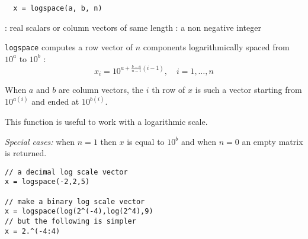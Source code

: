 \begin{mandesc}
\end{mandesc}
\begin{calling_sequence}
\begin{verbatim}
  x = logspace(a, b, n)
\end{verbatim}
\end{calling_sequence}

\begin{parameters}
  \begin{varlist}
    : real scalars or column vectors of same length
    : a non negative integer
  \end{varlist}
\end{parameters}
\begin{mandescription}
  \verb+logspace+ computes a row vector of $n$ components logarithmically spaced from $10^a$ to $10^b$ :
$$
    x_i = 10^{a + \frac{b-a}{n-1} (i-1)}, \quad i = 1, \dots, n
$$

   When $a$ and $b$ are column vectors, the $i$ th row of $x$ is such a vector starting from $10^{a(i)}$ and ended
  at $10^{b(i)}$.

   This function is useful to work with a logarithmic scale.

  {\em Special cases: } when $n=1$ then $x$ is equal to $10^b$ and when $n=0$ an empty matrix is returned.
\end{mandescription}

\begin{examples}
\begin{Verbatim}
// a decimal log scale vector
x = logspace(-2,2,5)

// make a binary log scale vector
x = logspace(log(2^(-4),log(2^4),9)
// but the following is simpler
x = 2.^(-4:4)
\end{Verbatim}

\end{examples}

\begin{manseealso}
\end{manseealso}

